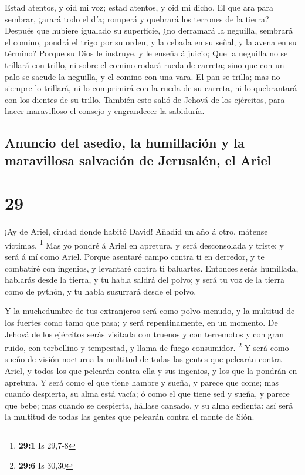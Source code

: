  Estad atentos, y oid mi voz; estad atentos, y oid mi
dicho.  El que ara para sembrar, ¿arará todo el día;
romperá y quebrará los terrones de la tierra?  Después
que hubiere igualado su superficie, ¿no derramará la neguilla, sembrará
el comino, pondrá el trigo por su orden, y la cebada en su señal, y la
avena en su término?  Porque su Dios le instruye, y le
enseña á juicio;  Que la neguilla no se trillará con
trillo, ni sobre el comino rodará rueda de carreta; sino que con un palo
se sacude la neguilla, y el comino con una vara.  El pan
se trilla; mas no siempre lo trillará, ni lo comprimirá con la rueda de
su carreta, ni lo quebrantará con los dientes de su trillo.
 También esto salió de Jehová de los ejércitos, para
hacer maravilloso el consejo y engrandecer la sabiduría.

\hypertarget{anuncio-del-asedio-la-humillaciuxf3n-y-la-maravillosa-salvaciuxf3n-de-jerusaluxe9n-el-ariel}{%
\subsection{Anuncio del asedio, la humillación y la maravillosa
salvación de Jerusalén, el
Ariel}\label{anuncio-del-asedio-la-humillaciuxf3n-y-la-maravillosa-salvaciuxf3n-de-jerusaluxe9n-el-ariel}}

\hypertarget{section-28}{%
\section{29}\label{section-28}}

 ¡Ay de Ariel, ciudad donde habitó David! Añadid un año á
otro, mátense víctimas. \footnote{\textbf{29:1} Is 29,7-8}
 Mas yo pondré á Ariel en apretura, y será desconsolada y
triste; y será á mí como Ariel.  Porque asentaré campo
contra ti en derredor, y te combatiré con ingenios, y levantaré contra
ti baluartes.  Entonces serás humillada, hablarás desde la
tierra, y tu habla saldrá del polvo; y será tu voz de la tierra como de
pythón, y tu habla susurrará desde el polvo.

 Y la muchedumbre de tus extranjeros será como polvo
menudo, y la multitud de los fuertes como tamo que pasa; y será
repentinamente, en un momento.  De Jehová de los ejércitos
serás visitada con truenos y con terremotos y con gran ruido, con
torbellino y tempestad, y llama de fuego consumidor. \footnote{\textbf{29:6}
  Is 30,30}  Y será como sueño de visión nocturna la
multitud de todas las gentes que pelearán contra Ariel, y todos los que
pelearán contra ella y sus ingenios, y los que la pondrán en apretura.
 Y será como el que tiene hambre y sueña, y parece que
come; mas cuando despierta, su alma está vacía; ó como el que tiene sed
y sueña, y parece que bebe; mas cuando se despierta, hállase cansado, y
su alma sedienta: así será la multitud de todas las gentes que pelearán
contra el monte de Sión.

